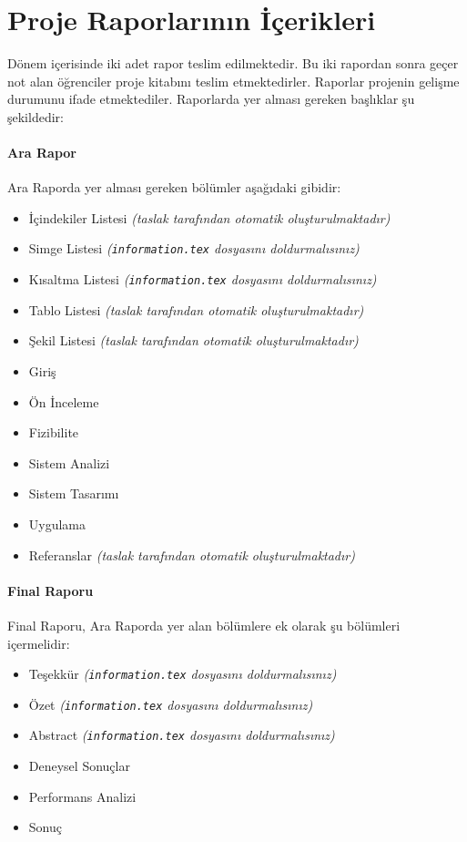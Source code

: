 \chapter{Proje Raporlarının İçerikleri}

Dönem içerisinde iki adet rapor teslim edilmektedir. Bu iki rapordan sonra geçer not alan öğrenciler proje kitabını teslim etmektedirler. Raporlar projenin gelişme durumunu ifade etmektediler. Raporlarda yer alması gereken başlıklar şu şekildedir:

\subsubsection*{Ara Rapor}

Ara Raporda yer alması gereken bölümler aşağıdaki gibidir:
\begin{itemize}
\item İçindekiler Listesi  \hfill \textit{(taslak tarafından otomatik oluşturulmaktadır)}
\item Simge Listesi \hfill \textit{(\texttt{information.tex} dosyasını doldurmalısınız)}
\item Kısaltma Listesi \hfill \textit{(\texttt{information.tex} dosyasını doldurmalısınız)}
\item Tablo Listesi \hfill \textit{(taslak tarafından otomatik oluşturulmaktadır)}
\item Şekil Listesi \hfill \textit{(taslak tarafından otomatik oluşturulmaktadır)}
\item Giriş
\item Ön İnceleme 
\item Fizibilite
\item Sistem Analizi 
\item Sistem Tasarımı
\item Uygulama
\item Referanslar \hfill \textit{(taslak tarafından otomatik oluşturulmaktadır)}
\end{itemize}

\subsubsection*{Final Raporu}

Final Raporu, Ara Raporda yer alan bölümlere ek olarak şu bölümleri içermelidir:

\begin{itemize} 
\item Teşekkür \hfill \textit{(\texttt{information.tex} dosyasını doldurmalısınız)}
\item Özet \hfill \textit{(\texttt{information.tex} dosyasını doldurmalısınız)}
\item Abstract \hfill \textit{(\texttt{information.tex} dosyasını doldurmalısınız)}
\item Deneysel Sonuçlar
\item Performans Analizi 
\item Sonuç
\end{itemize}

